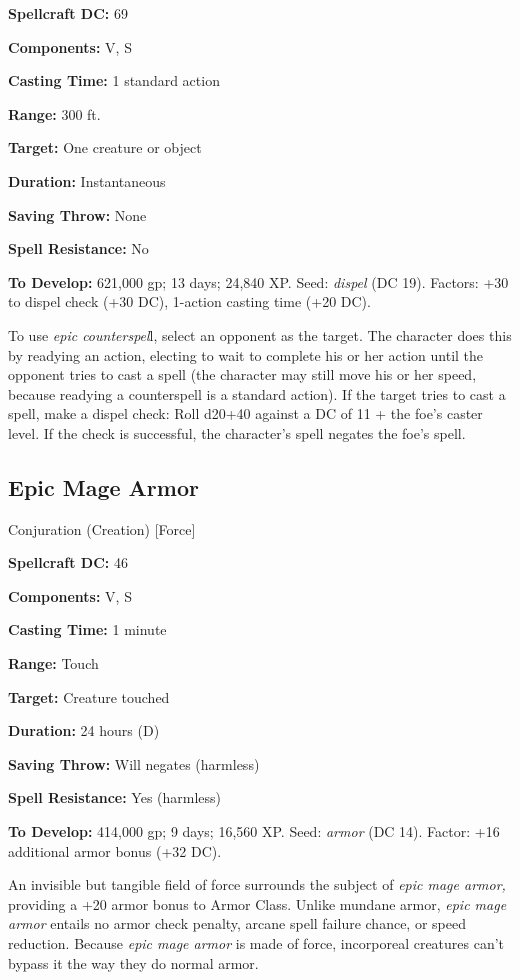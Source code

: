 \documentclass{article}
\begin{document}
\textbf{Spellcraft DC:} 69 

\textbf{Components:} V, S 

\textbf{Casting Time:} 1 standard action 

\textbf{Range:} 300 ft. 

\textbf{Target:} One creature or object 

\textbf{Duration:} Instantaneous 

\textbf{Saving Throw:} None 

\textbf{Spell Resistance:} No 

\textbf{To Develop:} 621,000 gp; 13 days; 24,840 XP. Seed: \textit{dispel }(DC 
19). Factors: +30 to dispel check (+30 DC), 1-action casting time (+20 DC). 

To use \textit{epic counterspel}l, select an opponent as the target. The character 
does this by readying an action, electing to wait to complete his or her action 
until the opponent tries to cast a spell (the character may still move his or her 
speed, because readying a counterspell is a standard action). If the target tries 
to cast a spell, make a dispel check: Roll d20+40 against a DC of 11 + the foe's 
caster level. If the check is successful, the character's spell negates the foe's 
spell. 

\vspace{12pt}
\subsection*{Epic Mage Armor }

Conjuration (Creation) [Force] 

\textbf{Spellcraft DC:} 46 

\textbf{Components:} V, S 

\textbf{Casting Time:} 1 minute 

\textbf{Range:} Touch 

\textbf{Target:} Creature touched 

\textbf{Duration:} 24 hours (D) 

\textbf{Saving Throw:} Will negates (harmless) 

\textbf{Spell Resistance:} Yes (harmless) 

\textbf{To Develop:} 414,000 gp; 9 days; 16,560 XP. Seed: \textit{armor }(DC 14). 
Factor: +16 additional armor bonus (+32 DC). 

An invisible but tangible field of force surrounds the subject of \textit{epic 
mage armor, }providing a +20 armor bonus to Armor Class. Unlike mundane armor, 
\textit{epic mage armor }entails no armor check penalty, arcane spell failure chance, 
or speed reduction. Because \textit{epic mage armor }is made of force, incorporeal 
creatures can't bypass it the way they do normal armor. 
\end{document}
